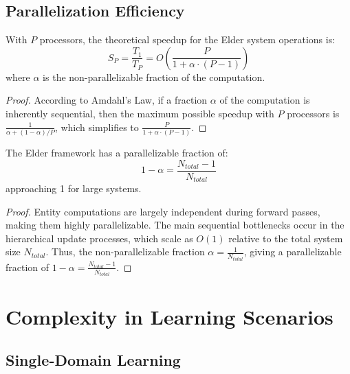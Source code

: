 \subsection{Parallelization Efficiency}

\begin{theorem}
With $P$ processors, the theoretical speedup for the Elder system operations is:
\begin{equation}
S_P = \frac{T_1}{T_P} = O\left(\frac{P}{1 + \alpha \cdot (P-1)}\right)
\end{equation}
where $\alpha$ is the non-parallelizable fraction of the computation.
\end{theorem}

\begin{proof}
According to Amdahl's Law, if a fraction $\alpha$ of the computation is inherently sequential, then the maximum possible speedup with $P$ processors is $\frac{1}{\alpha + (1-\alpha)/P}$, which simplifies to $\frac{P}{1 + \alpha \cdot (P-1)}$.
\end{proof}

\begin{theorem}
The Elder framework has a parallelizable fraction of:
\begin{equation}
1 - \alpha = \frac{N_{total} - 1}{N_{total}}
\end{equation}
approaching 1 for large systems.
\end{theorem}

\begin{proof}
Entity computations are largely independent during forward passes, making them highly parallelizable. The main sequential bottlenecks occur in the hierarchical update processes, which scale as $O(1)$ relative to the total system size $N_{total}$. Thus, the non-parallelizable fraction $\alpha = \frac{1}{N_{total}}$, giving a parallelizable fraction of $1 - \alpha = \frac{N_{total} - 1}{N_{total}}$.
\end{proof}

\section{Complexity in Learning Scenarios}

\subsection{Single-Domain Learning}

